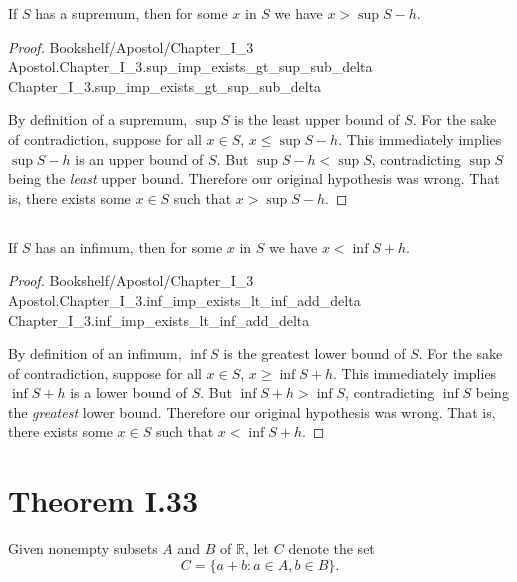 \documentclass{article}
\newcommand{\link}[1]{\lean{../..}
  {Bookshelf/Apostol/Chapter\_I\_3}
  {Apostol.Chapter\_I\_3.#1}
  {Chapter\_I\_3.#1}
}
\begin{document}
If $S$ has a supremum, then for some $x$ in $S$ we have $x > \sup{S} - h$.

\begin{proof}

  \link{sup\_imp\_exists\_gt\_sup\_sub\_delta}

  \divider

  By definition of a supremum, $\sup{S}$ is the least upper bound of $S$.
  For the sake of contradiction, suppose for all $x \in S$,
    $x \leq \sup{S} - h$.
  This immediately implies $\sup{S} - h$ is an upper bound of $S$.
  But $\sup{S} - h < \sup{S}$, contradicting $\sup{S}$ being the \textit{least}
    upper bound.
  Therefore our original hypothesis was wrong.
  That is, there exists some $x \in S$ such that $x > \sup{S} - h$.

\end{proof}

\subsection*{}%
%

If $S$ has an infimum, then for some $x$ in $S$ we have $x < \inf{S} + h$.

\begin{proof}

  \link{inf\_imp\_exists\_lt\_inf\_add\_delta}

  \divider

  By definition of an infimum, $\inf{S}$ is the greatest lower bound of $S$.
  For the sake of contradiction, suppose for all $x \in S$,
    $x \geq \inf{S} + h$.
  This immediately implies $\inf{S} + h$ is a lower bound of $S$.
  But $\inf{S} + h > \inf{S}$, contradicting $\inf{S}$ being the
    \textit{greatest} lower bound.
  Therefore our original hypothesis was wrong.
  That is, there exists some $x \in S$ such that $x < \inf{S} + h$.

\end{proof}

\section*{Theorem I.33}%
%

Given nonempty subsets $A$ and $B$ of $\mathbb{R}$, let $C$ denote the set
  $$C = \{a + b : a \in A, b \in B\}.$$

\end{document}
